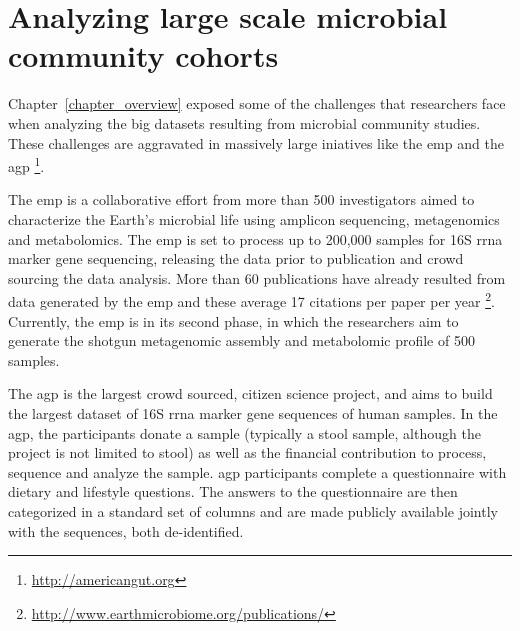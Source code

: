 \documentclass[12pt,chapterheads]{ucsd}
\begin{document}
\chapter{Analyzing large scale microbial community cohorts}\label{chapter_book}
\glsresetall

Chapter~\ref{chapter_overview} exposed some of the challenges that researchers
face when analyzing the big datasets resulting from microbial community
studies. These challenges are aggravated in massively large iniatives like
the \gls{emp} \cite{Gilbert2010, Gilbert2014} and the \gls{agp}
\footnote{\label{agpurl}\url{http://americangut.org}}.

The \gls{emp} is a collaborative effort from more than 500 investigators aimed
to characterize the Earth's microbial life using amplicon sequencing,
metagenomics and metabolomics. The \gls{emp} is set to process up to 200,000
samples for 16S \gls{rrna} marker gene sequencing, releasing the data prior to publication and
crowd sourcing the data analysis. More than 60 publications have already resulted
from data generated by the \gls{emp} and these average 17 citations per paper per year
\footnote{\label{emppuburl}\url{http://www.earthmicrobiome.org/publications/}}.
Currently, the \gls{emp} is in its second phase, in which the researchers aim to
generate the shotgun metagenomic assembly and metabolomic profile of 500 samples.

The \gls{agp} is the largest crowd sourced, citizen science project, and aims to
build the largest dataset of 16S \gls{rrna} marker gene sequences of human samples.
In the \gls{agp}, the participants donate a sample (typically a stool sample,
although the project is not limited to stool) as well as the financial contribution to
process, sequence and analyze the sample. \gls{agp} participants complete a
questionnaire with dietary and lifestyle questions. The answers to the
questionnaire are then categorized in a standard set of columns and are
made publicly available jointly with the sequences, both de-identified.
\end{document}
